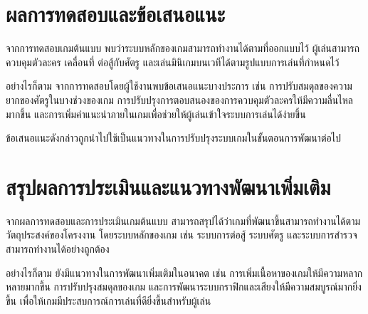 \section{ผลการทดสอบและข้อเสนอแนะ}

จากการทดสอบเกมต้นแบบ พบว่าระบบหลักของเกมสามารถทำงานได้ตามที่ออกแบบไว้ ผู้เล่นสามารถควบคุมตัวละคร เคลื่อนที่ ต่อสู้กับศัตรู และเล่นมินิเกมบนเวทีได้ตามรูปแบบการเล่นที่กำหนดไว้

อย่างไรก็ตาม จากการทดสอบโดยผู้ใช้งานพบข้อเสนอแนะบางประการ เช่น การปรับสมดุลของความยากของศัตรูในบางช่วงของเกม การปรับปรุงการตอบสนองของการควบคุมตัวละครให้มีความลื่นไหลมากขึ้น และการเพิ่มคำแนะนำภายในเกมเพื่อช่วยให้ผู้เล่นเข้าใจระบบการเล่นได้ง่ายขึ้น

ข้อเสนอแนะดังกล่าวถูกนำไปใช้เป็นแนวทางในการปรับปรุงระบบเกมในขั้นตอนการพัฒนาต่อไป

\section{สรุปผลการประเมินและแนวทางพัฒนาเพิ่มเติม}

จากผลการทดสอบและการประเมินเกมต้นแบบ สามารถสรุปได้ว่าเกมที่พัฒนาขึ้นสามารถทำงานได้ตามวัตถุประสงค์ของโครงงาน โดยระบบหลักของเกม เช่น ระบบการต่อสู้ ระบบศัตรู และระบบการสำรวจ สามารถทำงานได้อย่างถูกต้อง

อย่างไรก็ตาม ยังมีแนวทางในการพัฒนาเพิ่มเติมในอนาคต เช่น การเพิ่มเนื้อหาของเกมให้มีความหลากหลายมากขึ้น การปรับปรุงสมดุลของเกม และการพัฒนาระบบกราฟิกและเสียงให้มีความสมบูรณ์มากยิ่งขึ้น เพื่อให้เกมมีประสบการณ์การเล่นที่ดียิ่งขึ้นสำหรับผู้เล่น